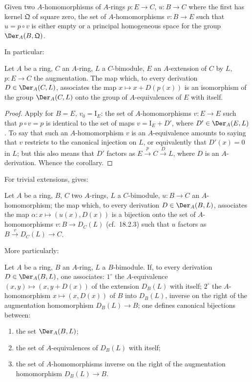 \begin{corollary}[20.1.3]
\label{0.20.1.3}
Given two $A$-homomorphisms of $A$-rings $p:E\to C$, $u:B\to C$ where the first has kernel $\mathfrak{Q}$ of square zero, the set of $A$-homomorphisms $v:B\to E$ such that $u=p\circ v$ is either empty or a principal homogeneous space for the group $\Der_A(B,\mathfrak{Q})$.
\end{corollary}

In particular:

\begin{corollary}[20.1.4]
\label{0.20.1.4}
Let $A$ be a ring, $C$ an $A$-ring, $L$ a $C$-bimodule, $E$ an $A$-extension of $C$ by $L$, $p:E\to C$ the augmentation.
The map which, to every derivation $D\in\Der_A(C,L)$, associates the map $x\mapsto x+D(p(x))$ is an isomorphism of the group $\Der_A(C,L)$ onto the group of $A$-equivalences of $E$ with itself.
\end{corollary}

\begin{proof}
Apply  for $B=E$, $v_0=\mathrm{I}_E$: the set of $A$-homomorphisms $v:E\to E$ such that $p\circ v=p$ is identical to the set of maps $v=\mathrm{I}_E+D'$, where $D'\in\Der_A(E,L)$.
To say that such an $A$-homomorphism $v$ is an $A$-equivalence amounts to saying that $v$ restricts to the canonical injection on $L$, or equivalently that $D'(x)=0$ in $L$; but this also means that $D'$ factors as $E\xrightarrow{p}C\xrightarrow{D}L$, where $D$ is an $A$-derivation.
Whence the corollary.
\end{proof}

For trivial extensions,  gives:

\begin{corollary}[20.1.5]
\label{0.20.1.5}
Let $A$ be a ring, $B$, $C$ two $A$-rings, $L$ a $C$-bimodule, $u:B\to C$ an $A$-homomorphism; the map which, to every derivation $D\in\Der_A(B,L)$, associates the map $\alpha:x\mapsto(u(x),D(x))$ is a bijection onto the set of $A$-homomorphisms $v:B\to D_C(L)$ \textup{(}cf.\ 18.2.3\textup{)} such that $u$ factors as $B\xrightarrow{v}D_C(L)\to C$.
\end{corollary}

More particularly:

\begin{corollary}[20.1.6]
\label{0.20.1.6}
Let $A$ be a ring, $B$ an $A$-ring, $L$ a $B$-bimodule.
If, to every derivation $D\in\Der_A(B,L)$, one associates: $1^\circ$ the $A$-equivalence $(x,y)\mapsto(x,y+D(x))$ of the extension $D_B(L)$ with itself; $2^\circ$ the $A$-homomorphism $x\mapsto(x,D(x))$ of $B$ into $D_B(L)$, inverse on the right of the augmentation homomorphism $D_B(L)\to B$; one defines canonical bijections between:
\begin{enumerate}
  \item[\rm(i)] the set $\Der_A(B,L)$;
  \item[\rm(ii)] the set of $A$-equivalences of $D_B(L)$ with itself;
  \item[\rm(iii)] the set of $A$-homomorphisms inverse on the right of the augmentation homomorphism $D_B(L)\to B$.
\end{enumerate}
\end{corollary}

